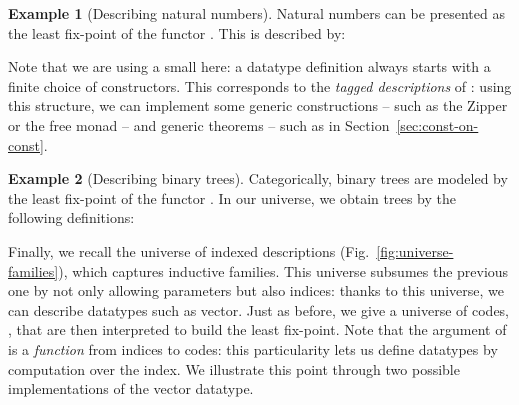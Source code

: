 \documentclass{scrartcl}
\theoremstyle{plain}
\theoremstyle{definition}
\newtheorem{example}{Example}
\begin{document}
\begin{example}[Describing natural numbers]

\renewcommand{\NatDDef}{
  \Let{\NatD}{\Desc}{
    \Return{\NatD}
           {\Dsigma[\Collection{
                        \begin{array}{l}
                          \Tag{0},\\ 
                          \Tag{\CN{suc}}
                        \end{array}}\:
                    \CollectionElim{
                      \begin{array}{l@{\DoReturn}l}
                        \Tag{0} & \DUnit, \\
                        \Tag{\CN{suc}} & \DVar
                      \end{array}
                    }]}}
}


Natural numbers can be presented as the least fix-point of the
functor . This is described by:

Note that we are using a small  here: a datatype definition
always starts with a finite choice of constructors. This corresponds
to the \emph{tagged descriptions} of \citet{dagand:levitation}: using
this structure, we can implement some generic constructions -- such as
the Zipper or the free monad -- and generic theorems -- such as in
Section~\ref{sec:const-on-const}.

\end{example}

\newcommand{\TreeD}{\Function{TreeD}}

\begin{example}[Describing binary trees]

Categorically, binary trees are modeled by the least fix-point of the
functor . In our universe, we obtain trees by the following definitions:

\end{example}





Finally, we recall the universe of indexed descriptions
(Fig.~\ref{fig:universe-families}), which captures inductive
families. This universe subsumes the previous one by not only allowing
parameters but also indices: thanks to this universe, we can describe
datatypes such as vector. Just as before, we give a universe of codes,
, that are then interpreted to build the least
fix-point. Note that the argument of  is a \emph{function}
from indices to codes: this particularity lets us define datatypes by
computation over the index. We illustrate this point through two
possible implementations of the vector datatype.
\end{document}
